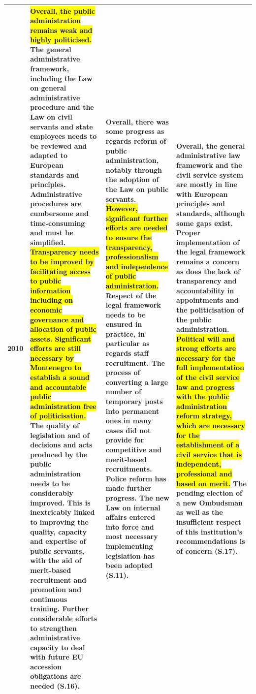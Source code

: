 \begin{footnotesize}
\begin{longtable}[H]{|p{1cm}|L{49mm}|L{44mm}|L{43mm}|}
2010&
\hl{Overall, the public administration remains weak and highly politicised.} The general administrative framework, including the Law on general administrative procedure and the Law on civil servants and state employees needs to be reviewed and adapted to European standards and principles. Administrative procedures are cumbersome and time-consuming and must be simplified. \hl{Transparency needs to be improved by facilitating access to public information including on economic governance and allocation of public assets. Significant efforts are still necessary by Montenegro to establish a sound and accountable public administration free of politicisation.} The quality of legislation and of decisions and acts produced by the public administration needs to be considerably improved. This is inextricably linked to improving the quality, capacity and expertise of public servants, with the aid of merit-based recruitment and promotion and continuous training. Further considerable efforts to strengthen administrative capacity to deal with future EU accession obligations are needed (S.16).&
Overall, there was some progress as regards reform of public administration, notably through the adoption of the Law on public servants. \hl{However, significant further efforts are needed to ensure the transparency, professionalism and independence of public administration.} Respect of the legal framework needs to be ensured in practice, in particular as regards staff recruitment. The process of converting a large number of temporary posts into permanent ones in many cases did not provide for competitive and merit-based recruitments. Police reform has made further progress. The new Law on internal affairs entered into force and most necessary implementing legislation has been adopted (S.11).&
Overall, the general administrative law framework and the civil service system are mostly in line with European principles and standards, although some gaps exist. Proper implementation of the legal framework remains a concern as does the lack of transparency and accountability in appointments and the politicisation of the public administration. \hl{Political will and strong efforts are necessary for the full implementation of the civil service law and progress with the public administration reform strategy, which are necessary for the establishment of a civil service that is independent, professional and based on merit.} The pending election of a new Ombudsman as well as the insufficient respect of this institution's recommendations is of concern (S.17).\\\hline

\end{longtable}
\end{footnotesize}

